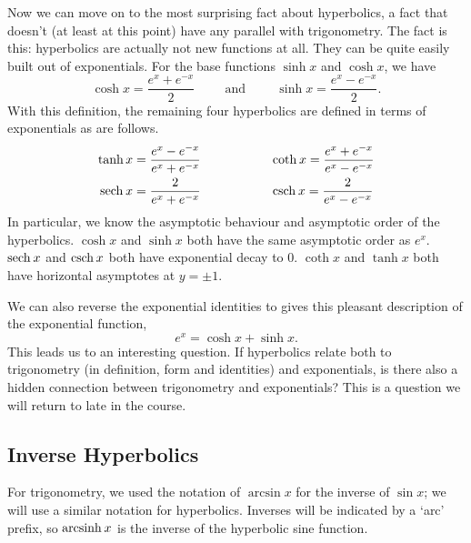 \documentclass[fleqn]{report}
\begin{document}
Now we can move on to the most surprising fact about
hyperbolics, a fact that doesn't (at least at this point) have
any parallel with trigonometry. The fact is this: hyperbolics
are actually not new functions at all. They can be quite
easily built out of exponentials. For the base functions
$\sinh x$ and $\cosh x$, we have
\begin{equation*}
\cosh x = \frac{e^x + e^{-x}}{2} \hspace{1cm} \text{and}
\hspace{1cm} \sinh x = \frac{e^x - e^{-x}}{2}.
\end{equation*}
With this definition, the remaining four hyperbolics are
defined in terms of exponentials as are follows.
\begin{align*}
\tanh x = \frac{e^x - e^{-x}}{e^x + e^{-x}} & \hspace{2cm} 
\mathrm{coth}\hspace{0.07cm} x = \frac{e^x + e^{-x}}{e^x - e^{-x}} \\
\mathrm{sech}\hspace{0.07cm} x = \frac{2}{e^x + e^{-x}} & \hspace{2cm} 
\mathrm{csch}\hspace{0.07cm} x = \frac{2}{e^x - e^{-x}} \\
\end{align*}
In particular, we know the asymptotic behaviour and
asymptotic order of the hyperbolics. $\cosh x$ and $\sinh x$
both have the same asymptotic order as $e^x$. $\mathrm{sech}\hspace{0.07cm} x$ and
$\mathrm{csch}\hspace{0.07cm} x$ both have exponential decay to 0. $\coth x$ and
$\tanh x$ both have horizontal asymptotes at $y=\pm1$.

We can also reverse the exponential identities to gives this
pleasant description of the exponential function,
\begin{equation*}
e^x = \cosh x + \sinh x.
\end{equation*}
This leads us to an interesting question. If hyperbolics
relate both to trigonometry (in definition, form and
identities) and exponentials, is there also a hidden
connection between trigonometry and exponentials? This is a
question we will return to late in the course.

\subsection{Inverse Hyperbolics}
\label{inverse-hyperbolics}

For trigonometry, we used the notation of $\arcsin x$ for the
inverse of $\sin x$; we will use a similar notation for
hyperbolics. Inverses will be indicated by a `arc' prefix, so
$\mathrm{arcsinh\hspace{0.07cm}} x$ is the inverse of the hyperbolic sine function.
\end{document}
